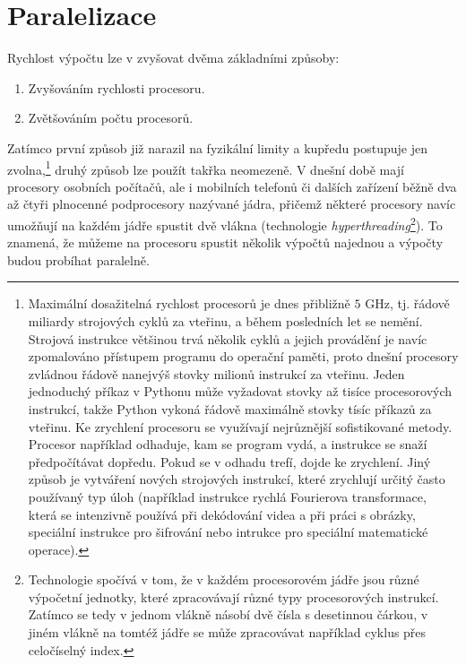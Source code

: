 \documentclass[a4paper,11pt,twoside]{article}
\theoremstyle{red}
\theoremstyle{green}
\begin{document}
    
    \section{Paralelizace}
    Rychlost výpočtu lze v zvyšovat dvěma základními způsoby:
    \begin{enumerate}
        \item Zvyšováním rychlosti procesoru.
        \item Zvětšováním počtu procesorů.
    \end{enumerate}
    Zatímco první způsob již narazil na fyzikální limity a kupředu postupuje jen zvolna,\footnote{
        Maximální dosažitelná rychlost procesorů je dnes přibližně $5$ GHz, tj. řádově miliardy strojových cyklů za vteřinu, a během posledních let se nemění. 
        Strojová instrukce většinou trvá několik cyklů a jejich provádění je navíc zpomalováno přístupem programu do operační paměti, proto dnešní procesory zvládnou řádově nanejvýš stovky milionů instrukcí za vteřinu.
        Jeden jednoduchý příkaz v Pythonu může vyžadovat stovky až tisíce procesorových instrukcí, takže Python vykoná řádově maximálně stovky tísíc příkazů za vteřinu.
        Ke zrychlení procesoru se využívají nejrůznější sofistikované metody. 
        Procesor například odhaduje, kam se program vydá, a instrukce se snaží předpočítávat dopředu. 
        Pokud se v odhadu trefí, dojde ke zrychlení.
        Jiný způsob je vytváření nových strojových instrukcí, které zrychlují určitý často používaný typ úloh (například instrukce rychlá Fourierova transformace, která se intenzivně používá při dekódování videa a při práci s obrázky, speciální instrukce pro šifrování nebo intrukce pro speciální matematické operace).
    } 
    druhý způsob lze použít takřka neomezeně.
    V dnešní době mají procesory osobních počítačů, ale i mobilních telefonů či dalších zařízení běžně dva až čtyři plnocenné podprocesory nazývané jádra, přičemž některé procesory navíc umožňují na každém jádře spustit dvě vlákna (technologie \emph{hyperthreading}\footnote{
        Technologie spočívá v tom, že v každém procesorovém jádře jsou různé výpočetní jednotky, které zpracovávají různé typy procesorových instrukcí.
        Zatímco se tedy v jednom vlákně násobí dvě čísla s desetinnou čárkou, v jiném vlákně na tomtéž jádře se může zpracovávat například cyklus přes celočíselný index.
    }).
    To znamená, že můžeme na procesoru spustit několik výpočtů najednou a výpočty budou probíhat paralelně.
    
\end{document}
